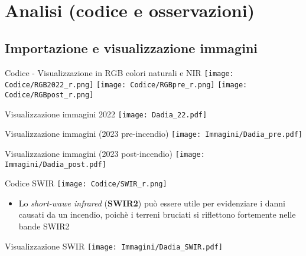 \documentclass{beamer}
\begin{document}
\section{Analisi (codice e osservazioni)}

\subsection{Importazione e visualizzazione immagini}


\begin{frame}{Codice - Visualizzazione in RGB colori naturali e NIR}
\texttt{[image: Codice/RGB2022\_r.png]}
\centering
\texttt{[image: Codice/RGBpre\_r.png]}
\centering
\texttt{[image: Codice/RGBpost\_r.png]}
\centering
\end{frame}


\begin{frame}{Visualizzazione immagini 2022}
\texttt{[image: Dadia\_22.pdf]}
\caption{\textit{Colori naturali} (sinistra), \textit{NIR} (destra)}
\centering  
\end{frame}



\begin{frame}{Visualizzazione immagini (2023 pre-incendio)}
 \texttt{[image: Immagini/Dadia\_pre.pdf]}
 \caption{\textit{Colori naturali} (sinistra), \textit{NIR} (destra)}
 \centering
 
\end{frame}

\begin{frame}{Visualizzazione immagini (2023 post-incendio)}
 \texttt{[image: Immagini/Dadia\_post.pdf]}
 \caption{\textit{Colori naturali} (sinistra), \textit{NIR} (destra)}
 \centering
\end{frame}

\begin{frame}{Codice SWIR}
\texttt{[image: Codice/SWIR\_r.png]}
\centering
\begin{itemize}
    \item Lo \textit{short-wawe infrared} (\textbf{SWIR2}) può essere utile per evidenziare i danni causati da un incendio, poichè i terreni bruciati si riflettono fortemente nelle bande SWIR2
\end{itemize}
\end{frame}

\begin{frame}{Visualizzazione SWIR}
 \texttt{[image: Immagini/Dadia\_SWIR.pdf]}
    \centering
    \end{frame}
\end{document}
